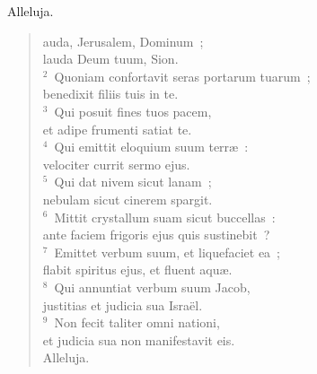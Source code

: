 \bchapter[Psalm]
Alleluja. \begin{verse}auda, Jerusalem, Dominum~;\\ lauda Deum tuum, Sion.\\
${}^{2}$~Quoniam confortavit seras portarum tuarum~;\\ benedixit filiis tuis in te.\\
${}^{3}$~Qui posuit fines tuos pacem,\\ et adipe frumenti satiat te.\\
${}^{4}$~Qui emittit eloquium suum terr\ae~:\\ velociter currit sermo ejus.\\
${}^{5}$~Qui dat nivem sicut lanam~;\\ nebulam sicut cinerem spargit.\\
${}^{6}$~Mittit crystallum suam sicut buccellas~:\\ ante faciem frigoris ejus quis sustinebit~?\\
${}^{7}$~Emittet verbum suum, et liquefaciet ea~;\\ flabit spiritus ejus, et fluent aqu\ae .\\
${}^{8}$~Qui annuntiat verbum suum Jacob,\\ justitias et judicia sua Isra\"el.\\
${}^{9}$~Non fecit taliter omni nationi,\\ et judicia sua non manifestavit eis.\\ Alleluja.\end{verse}



